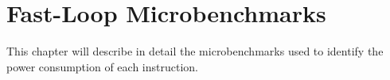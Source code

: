 \section{Fast-Loop Microbenchmarks}
This chapter will describe in detail the microbenchmarks used to identify the
power consumption of each instruction.

